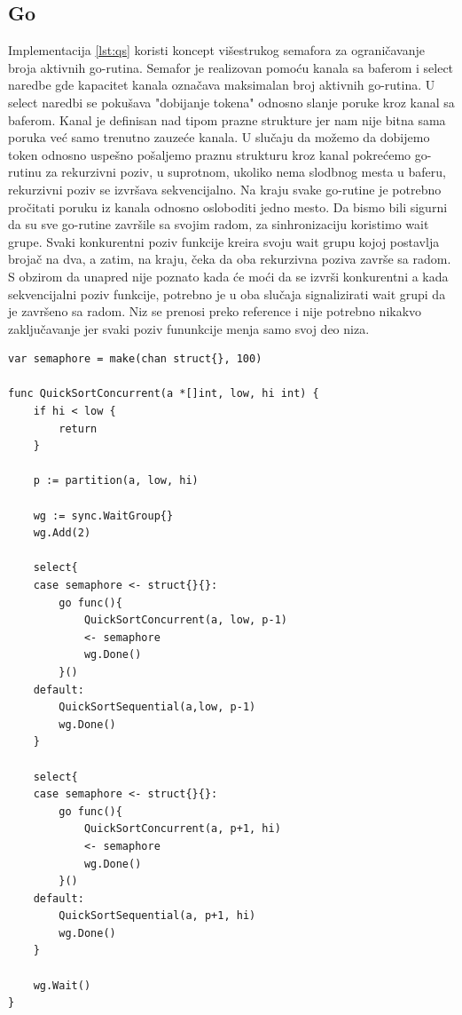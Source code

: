 \documentclass[12pt,oneside]{memoir}
\begin{document}
\subsection{Go}
\label{qs:go}
Implementacija \ref{lst:qs} koristi koncept višestrukog semafora za ograničavanje broja aktivnih go-rutina. Semafor je realizovan pomoću kanala sa baferom i select naredbe gde kapacitet kanala označava maksimalan broj aktivnih go-rutina. U select naredbi se pokušava "dobijanje tokena" odnosno slanje poruke kroz kanal sa baferom. Kanal je definisan nad tipom prazne strukture jer nam nije bitna sama poruka već samo trenutno zauzeće kanala. U slučaju da možemo da dobijemo token odnosno uspešno pošaljemo praznu strukturu kroz kanal pokrećemo go-rutinu za rekurzivni poziv, u suprotnom, ukoliko nema slodbnog mesta u baferu, rekurzivni poziv se izvršava sekvencijalno. Na kraju svake go-rutine je potrebno pročitati poruku iz kanala odnosno osloboditi jedno mesto. Da bismo bili sigurni da su sve go-rutine završile sa svojim radom, za sinhronizaciju koristimo wait grupe. Svaki konkurentni poziv funkcije kreira svoju wait grupu kojoj postavlja brojač na dva, a zatim, na kraju, čeka da oba rekurzivna poziva završe sa radom. S obzirom da unapred nije poznato kada će moći da se izvrši konkurentni a kada sekvencijalni poziv funkcije, potrebno je u oba slučaja signalizirati wait grupi da je završeno sa radom. Niz se prenosi preko reference i nije potrebno nikakvo zaključavanje jer svaki poziv fununkcije menja samo svoj deo niza.

\begin{center}
\begin{lstlisting}[caption=Go implementacija konkurentne quicksort funkcije,label={lst:qs},float,  backgroundcolor=\color{background}]
var semaphore = make(chan struct{}, 100)

func QuickSortConcurrent(a *[]int, low, hi int) {
	if hi < low {
		return
	}

	p := partition(a, low, hi)

	wg := sync.WaitGroup{}
	wg.Add(2)

	select{
	case semaphore <- struct{}{}:
		go func(){
			QuickSortConcurrent(a, low, p-1)
			<- semaphore
			wg.Done()
		}()
	default:
		QuickSortSequential(a,low, p-1)
		wg.Done()
	}

	select{
	case semaphore <- struct{}{}:
		go func(){
			QuickSortConcurrent(a, p+1, hi)
			<- semaphore
			wg.Done()
		}()
	default:
		QuickSortSequential(a, p+1, hi)
		wg.Done()
	}

	wg.Wait()
}
\end{lstlisting}
\end{center}
\end{document}
